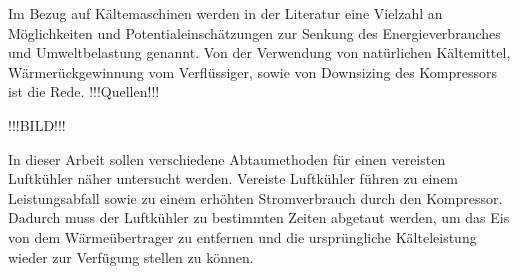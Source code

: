 Im Bezug auf Kältemaschinen werden in der Literatur eine Vielzahl an Möglichkeiten und Potentialeinschätzungen zur Senkung des Energieverbrauches und Umweltbelastung genannt. Von der Verwendung von natürlichen Kältemittel, Wärmerückgewinnung vom Verflüssiger, sowie von Downsizing des Kompressors ist die Rede. !!!Quellen!!!

!!!BILD!!!

In dieser Arbeit sollen verschiedene Abtaumethoden für einen vereisten Luftkühler näher untersucht werden. Vereiste Luftkühler führen zu einem Leistungsabfall sowie zu einem erhöhten Stromverbrauch durch den Kompressor. Dadurch muss der Luftkühler zu bestimmten Zeiten abgetaut werden, um das Eis von dem Wärmeübertrager zu entfernen und die ursprüngliche Kälteleistung wieder zur Verfügung stellen zu können. 



